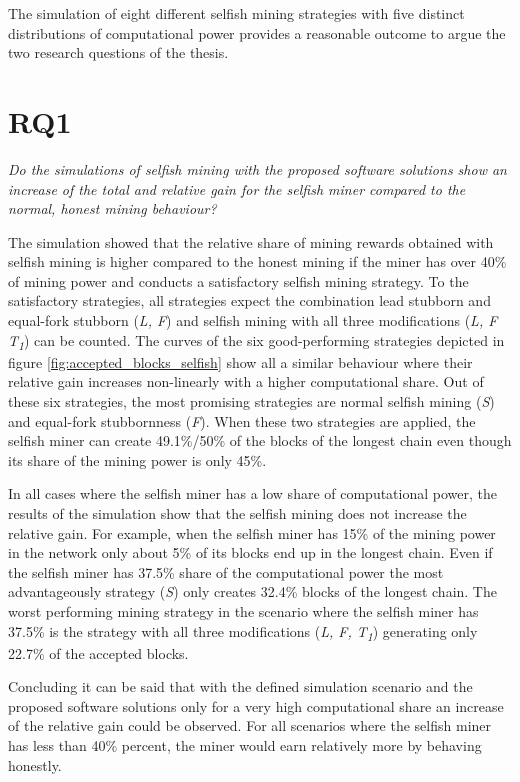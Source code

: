 The simulation of eight different selfish mining strategies with five distinct distributions of computational power provides a reasonable outcome to argue the two research questions of the thesis.

\section{RQ1}

\textit{Do the simulations of selfish mining with the proposed software solutions show an increase of the total and relative gain for the selfish miner compared to the normal, honest mining behaviour?}

The simulation showed that the relative share of mining rewards obtained with selfish mining is higher compared to the honest mining if the miner has over 40\% of mining power and conducts a satisfactory selfish mining strategy.
To the satisfactory strategies, all strategies expect the combination lead stubborn and equal-fork stubborn (\textit{L, F}) and selfish mining with all three modifications (\textit{L, F T\textsubscript{1}}) can be counted.
The curves of the six good-performing strategies depicted in figure \ref{fig:accepted_blocks_selfish} show all a similar behaviour where their relative gain increases non-linearly with a higher computational share.
Out of these six strategies, the most promising strategies are normal selfish mining (\textit{S}) and equal-fork stubbornness (\textit{F}).
When these two strategies are applied, the selfish miner can create 49.1\%/50\% of the blocks of the longest chain even though its share of the mining power is only 45\%.

In all cases where the selfish miner has a low share of computational power, the results of the simulation show that the selfish mining does not increase the relative gain.
For example, when the selfish miner has 15\% of the mining power in the network only about 5\% of its blocks end up in the longest chain.
Even if the selfish miner has 37.5\% share of the computational power the most advantageously strategy (\textit{S}) only creates 32.4\% blocks of the longest chain.
The worst performing mining strategy in the scenario where the selfish miner has 37.5\% is the strategy with all three modifications (\textit{L, F, T\textsubscript{1}}) generating only 22.7\% of the accepted blocks.

Concluding it can be said that with the defined simulation scenario and the proposed software solutions only for a very high computational share an increase of the relative gain could be observed.
For all scenarios where the selfish miner has less than 40\% percent, the miner would earn relatively more by behaving honestly.

